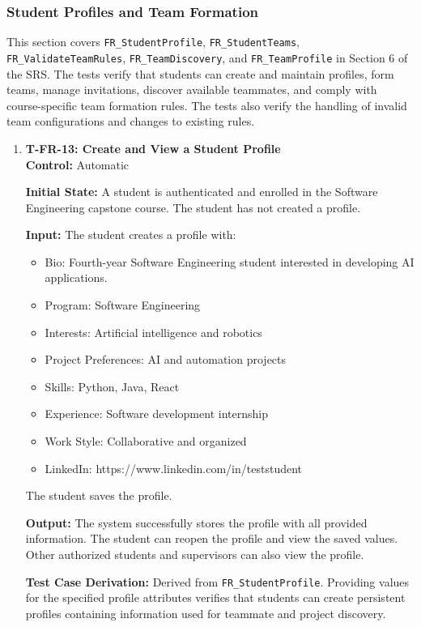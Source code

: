 \documentclass[12pt, titlepage]{article}
\begin{document}
\subsubsection{Student Profiles and Team Formation}

This section covers \texttt{FR\_StudentProfile}, \texttt{FR\_StudentTeams}, \texttt{FR\_ValidateTeamRules}, \texttt{FR\_TeamDiscovery}, and \texttt{FR\_TeamProfile} in Section 6 of the SRS. The tests verify that students can create and maintain profiles, form teams, manage invitations, discover available teammates, and comply with course-specific team formation rules. The tests also verify the handling of invalid team configurations and changes to existing rules.

\begin{enumerate}

\item \label{T-FR-13}\textbf{T-FR-13: Create and View a Student Profile}\\

\textbf{Control:} Automatic

\textbf{Initial State:} A student is authenticated and enrolled in the Software Engineering capstone course. The student has not created a profile.

\textbf{Input:} The student creates a profile with:
\begin{itemize}
    \item Bio: Fourth-year Software Engineering student interested in developing
    AI applications.
    \item Program: Software Engineering
    \item Interests: Artificial intelligence and robotics
    \item Project Preferences: AI and automation projects
    \item Skills: Python, Java, React
    \item Experience: Software development internship
    \item Work Style: Collaborative and organized
    \item LinkedIn: https://www.linkedin.com/in/teststudent
\end{itemize}
The student saves the profile.

\textbf{Output:} The system successfully stores the profile with all provided information. The student can reopen the profile and view the saved values. Other authorized students and supervisors can also view the profile.

\textbf{Test Case Derivation:} Derived from \texttt{FR\_StudentProfile}. Providing values for the specified profile attributes verifies that students can create persistent profiles containing information used for teammate and project discovery.


\end{enumerate}
\end{document}
